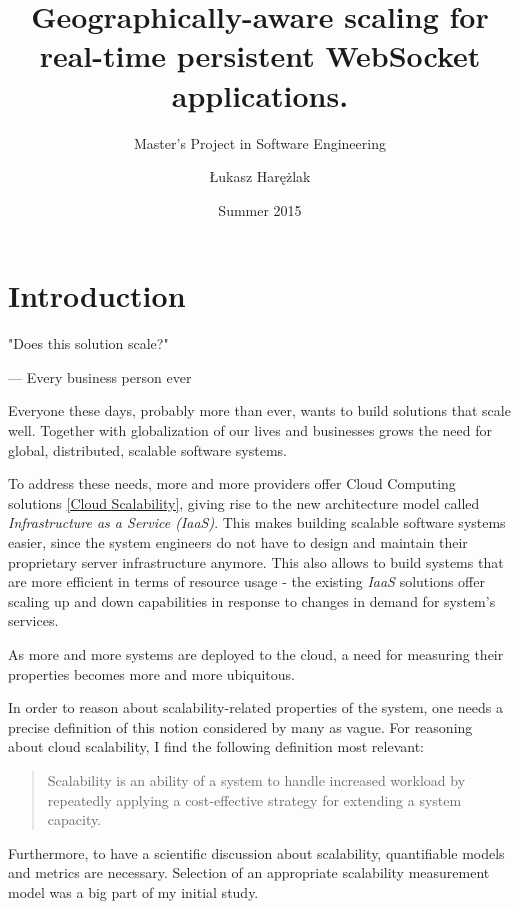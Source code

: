 \documentclass{uvamscse}
\title{Geographically-aware scaling for real-time persistent WebSocket applications.}
\subtitle{Master's Project in Software Engineering}
\date{Summer 2015}
\author{Łukasz Harężlak}
\begin{document}
\maketitle


\chapter{Introduction}

\epigraph{"Does this solution scale?"}{--- Every business person ever}

Everyone these days, probably more than ever, wants to build solutions that scale well. Together with globalization of our lives and businesses grows the need for global, distributed, scalable software systems.

To address these needs, more and more providers offer Cloud Computing solutions \ref{Cloud Scalability}, giving rise to the new architecture model called \textit{Infrastructure as a Service (IaaS)}. This makes building scalable software systems easier, since the system engineers do not have to design and maintain their proprietary server infrastructure anymore. This also allows to build systems that are more efficient in terms of resource usage - the existing \textit{IaaS} solutions offer scaling up and down capabilities in response to changes in demand for system's services.

As more and more systems are deployed to the cloud, a need for measuring their properties becomes more and more ubiquitous.

In order to reason about scalability-related properties of the system, one needs a precise definition of this notion considered by many as vague. For reasoning about cloud scalability, I find the following definition most relevant:

\begin{quote}
\cite{WeinstockOnSystem2006} Scalability is an ability of a system to handle increased workload by repeatedly applying a cost-effective strategy for extending a system capacity.
\end{quote}

Furthermore, to have a scientific discussion about scalability, quantifiable models and metrics are necessary. Selection of an appropriate scalability measurement model was a big part of my initial study.
\end{document}
